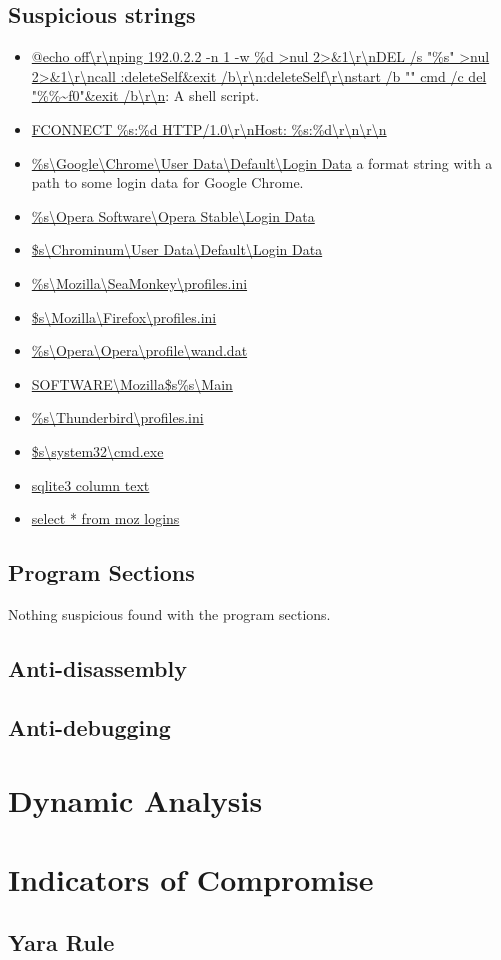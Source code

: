 \documentclass{article}
\begin{document}
    \subsection{Suspicious strings}
    \begin{itemize}
        \item \url{@echo off\r\nping 192.0.2.2 -n 1 -w %d >nul 2>&1\r\nDEL /s "%s" >nul 2>&1\r\ncall :deleteSelf&exit /b\r\n:deleteSelf\r\nstart /b "" cmd /c del "%%~f0"&exit /b\r\n}: A shell script.
        \item \url{FCONNECT %s:%d HTTP/1.0\r\nHost: %s:%d\r\n\r\n}
        \item \url{%s\Google\Chrome\User Data\Default\Login Data} a format string with a path to some login data for Google Chrome.
        \item \url{%s\Opera Software\Opera Stable\Login Data}
        \item \url{$s\Chrominum\User Data\Default\Login Data}
        \item \url{%s\Mozilla\SeaMonkey\profiles.ini}
        \item \url{$s\Mozilla\Firefox\profiles.ini}
        \item \url{%s\Opera\Opera\profile\wand.dat}
        \item \url{SOFTWARE\Mozilla\$s\%s\Main}
        \item \url{%s\Thunderbird\profiles.ini}
        \item \url{$s\system32\cmd.exe}
        \item \url{sqlite3 column text}
        \item \url{select * from moz logins}
    \end{itemize}
    \subsection{Program Sections}
    Nothing suspicious found with the program sections.
    \subsection{Anti-disassembly}
    \subsection{Anti-debugging}
    \pagebreak
    \section{Dynamic Analysis}
    \pagebreak
    \section{Indicators of Compromise}
    \subsection{Yara Rule}
    \pagebreak
    \printbibliography
\end{document}
